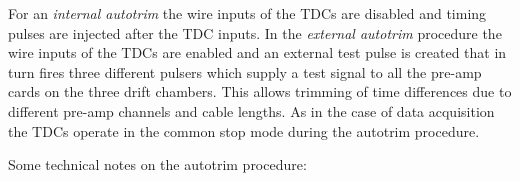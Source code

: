 \documentclass[11pt]{report}
\begin{document}
For an {\it internal autotrim} the wire inputs of the TDCs are disabled 
and timing pulses are injected after the TDC inputs. 
In the {\it external autotrim} procedure the wire inputs of the TDCs
are enabled and an external test pulse is created that in turn fires
three different pulsers which supply a test signal to all the pre-amp cards
on the three drift chambers.
This allows trimming of time differences due to different 
pre-amp channels and cable lengths.
As in the case of data acquisition the TDCs operate in the common stop mode
during the autotrim procedure.

Some technical notes on the autotrim procedure:
\end{document}
